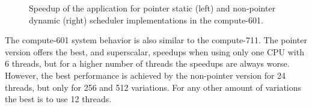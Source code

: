 \begin{figure}[!htp]
	\begin{center}
		\caption{Speedup of the \tth application for pointer static (left) and non-pointer dynamic (right) scheduler implementations in the compute-601.}
		\label{fig:Speedup601}
	\end{center}
\end{figure}

The compute-601 system behavior is also similar to the compute-711. The pointer version offers the best, and superscalar, speedups when using only one CPU with 6 threads, but for a higher number of threads the speedups are always worse. However, the best performance is achieved by the non-pointer version for 24 threads, but only for 256 and 512 variations. For any other amount of variations the best is to use 12 threads.

